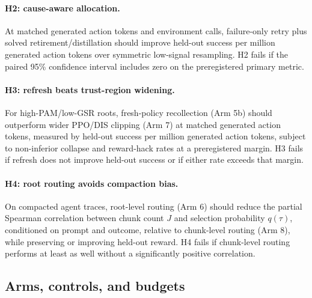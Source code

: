 \documentclass{article}
\begin{document}
\paragraph{H2: cause-aware allocation.}
At matched generated action tokens and environment calls, failure-only retry
plus solved retirement/distillation should improve held-out success per million
generated action tokens over symmetric low-signal resampling.  H2 fails if the paired
95\% confidence interval includes zero on the preregistered primary metric.

\paragraph{H3: refresh beats trust-region widening.}
For high-PAM/low-GSR roots, fresh-policy recollection (Arm 5b) should
outperform wider PPO/DIS clipping (Arm 7) at matched generated action tokens,
measured by held-out success per million generated action tokens, subject to
non-inferior collapse and reward-hack rates at a preregistered margin.  H3 fails
if refresh does not improve held-out success or if either rate exceeds that
margin.

\paragraph{H4: root routing avoids compaction bias.}
On compacted agent traces, root-level routing (Arm 6) should reduce the
partial Spearman correlation between chunk count $J$ and selection probability
$q(\tau)$, conditioned on prompt and outcome, relative to chunk-level routing
(Arm 8), while preserving or improving held-out reward.  H4 fails if chunk-level
routing performs at least as well without a significantly positive correlation.

\subsection{Arms, controls, and budgets}
\end{document}
